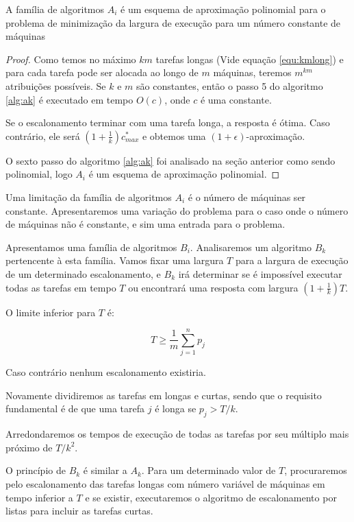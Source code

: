 \begin{teorema}
A família de algoritmos $A_i$ é um esquema de aproximação polinomial para o problema de minimização da largura de execução para um número constante de máquinas
\end{teorema} 

\begin{proof}
Como temos no máximo $km$ tarefas longas (Vide equação \ref{equ:kmlong}) e para cada tarefa pode ser alocada ao longo de $m$ máquinas, teremos $m^{km}$ atribuições possíveis. Se $k$ e $m$ são constantes, então o passo 5 do algoritmo \ref{alg:ak} é executado em tempo $O(c)$, onde $c$ é uma constante.

Se o escalonamento terminar com uma tarefa longa, a resposta é ótima. Caso contrário, ele será $\left(1 + \frac{1}{k}\right) c_{max}^*$ e obtemos uma $(1 + \epsilon)$-aproximação.

O sexto passo do algoritmo \ref{alg:ak} foi analisado na seção anterior como sendo polinomial, logo $A_i$ é um esquema de aproximação polinomial.
\end{proof}

Uma limitação da família de algoritmos $A_i$ é o número de máquinas ser constante. Apresentaremos uma variação do problema para o caso onde o número de máquinas não é constante, e sim uma entrada para o problema.

Apresentamos uma família de algoritmos $B_i$. Analisaremos um algoritmo $B_k$ pertencente à esta família. Vamos fixar uma largura $T$ para a largura de execução de um determinado escalonamento, e $B_k$ irá determinar se é impossível executar todas as tarefas em tempo $T$ ou encontrará uma resposta com largura $\left(1 + \frac{1}{k}\right) T$.

O limite inferior para $T$ é:

\begin{equation}
T \geq \frac{1}{m} \sum_{j=1}^{n} p_j
\end{equation}

Caso contrário nenhum escalonamento existiria.

Novamente dividiremos as tarefas em longas e curtas, sendo que o requisito fundamental é de que uma tarefa $j$ é longa se $p_j > T / k$.

Arredondaremos os tempos de execução de todas as tarefas por seu múltiplo mais próximo de $T/k^2$.

O princípio de $B_k$ é similar a $A_k$. Para um determinado valor de $T$, procuraremos pelo escalonamento das tarefas longas com número variável de máquinas em tempo inferior a $T$ e se existir, executaremos o algoritmo de escalonamento por listas para incluir as tarefas curtas.

